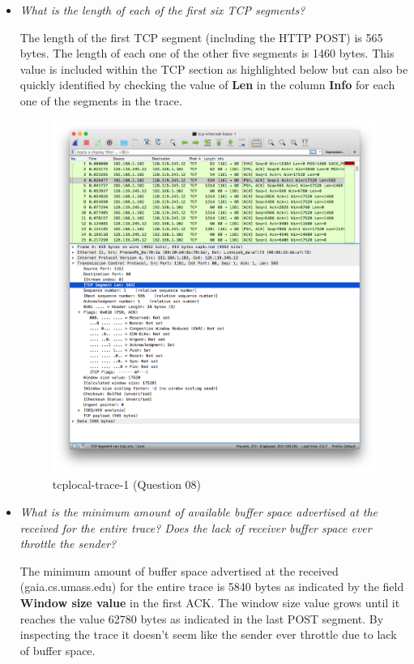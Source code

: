 \documentclass[11pt]{article}
\begin{document}
\begin{itemize}
\pagebreak

	\item
		\textit{What is the length of each of the first six TCP segments?}
		\par The length of the first TCP segment (including the HTTP POST) is 565 bytes. The length of each one of the other five segments is 1460 bytes.  This value is included within the TCP section as highlighted below but can also be quickly identified by checking the value of \textbf{Len} in the column \textbf{Info} for each one of the segments in the trace. 
		
		\begin{figure}[H]
		\centering
		\caption{tcplocal-trace-1 (Question 08)}
		\includegraphics[width=400px]{07}
		\end{figure}
		
	\item
		\textit{What is the minimum amount of available buffer space advertised at the received for the
entire trace? Does the lack of receiver buffer space ever throttle the sender?}
		\par The minimum amount of buffer space advertised at the received (gaia.cs.umass.edu) for the entire trace is 5840 bytes as indicated by the field \textbf{Window size value} in the first ACK. The window size value grows until it reaches the value 62780 bytes as indicated in the last POST segment. By inspecting the trace it doesn't seem like the sender ever throttle due to lack of buffer space.
		

\end{itemize}
\end{document}
